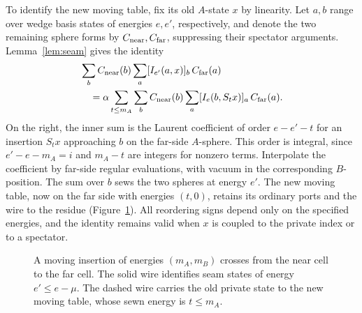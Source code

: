 To identify the new moving table, fix its old $A$-state $x$ by
linearity. Let $a,b$ range over wedge basis states of energies $e,e'$,
respectively, and denote the two remaining sphere forms by
$C_{\rm near},C_{\rm far}$, suppressing their spectator arguments.
Lemma~\ref{lem:seam} gives the identity
\[
\begin{aligned}
 &\sum_b C_{\rm near}(b)\sum_a [I_{e'}(a,x)]_b\,C_{\rm far}(a)\\
 &\hspace{1em}=\alpha\sum_{t\le m_A}\sum_b C_{\rm near}(b)
                      \sum_a [I_e(b,S_t x)]_a\,C_{\rm far}(a).
\end{aligned}
\]
On the right, the inner sum is the Laurent coefficient of order
$e-e'-t$ for an insertion $S_t x$ approaching $b$ on the far-side
$A$-sphere. This order is integral, since $e'-e-m_A=i$ and $m_A-t$
are integers for nonzero terms. Interpolate the coefficient by far-side
regular evaluations, with vacuum in the corresponding $B$-position.
The sum over $b$ sews the two spheres at energy $e'$. The new moving
table, now on the far side with energies $(t,0)$, retains its ordinary
ports and the wire to the residue (Figure~\ref{fig:motion-crossing}).
All reordering signs depend only on the specified energies, and the
identity remains valid when $x$ is coupled to the private index or to a
spectator.

\begin{figure}[!htbp]
\centering
{}
\caption{A moving insertion of energies $(m_A,m_B)$ crosses from the near
cell to the far cell. The solid wire identifies seam states of energy $e'\le e-\mu$. The dashed
wire carries the old private state to the new moving table, whose sewn
energy is $t\le m_A$.}
\label{fig:motion-crossing}
\end{figure}

